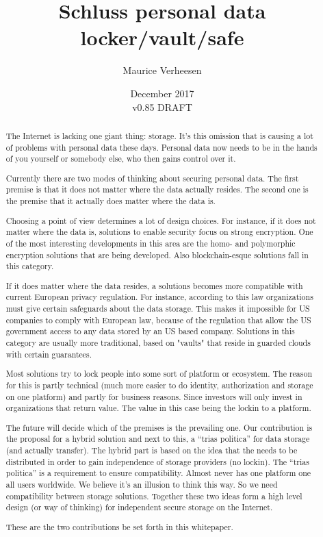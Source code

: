 \documentclass{article}
\title{Schluss personal data locker/vault/safe}
\author{Maurice Verheesen}
\date{December 2017 \\ v0.85 DRAFT}
\begin{document}
\maketitle
\begin{abstract}
The Internet is lacking one giant thing: storage. It's this omission that is causing
a lot of problems with personal data these days. Personal data now needs to be in the hands of you yourself or somebody else, who then gains control over it.

Currently there are two modes of thinking about securing personal data. The first
premise is that it does not matter where the data actually resides. The second one
is the premise that it actually does matter where the data is.

Choosing a point of view determines a lot of design choices. For instance, if it
does not matter where the data is, solutions to enable security focus on strong
encryption. One of the most interesting developments in this area are the homo- and
polymorphic encryption solutions that are being developed. Also blockchain-esque solutions fall in this category.

If it does matter where the data resides, a solutions becomes more compatible with
current European privacy regulation. For instance, according to this law organizations must give certain safeguards about the data storage. This makes it impossible for US companies to comply with European law, because of the regulation that allow the US government access to any data stored by an US based company. Solutions in this category are usually more traditional, based on "vaults" that reside in guarded clouds with
certain guarantees.

Most solutions try to lock people into some sort of platform or ecosystem. The reason for this is partly technical (much more easier to do identity, authorization and storage on one platform) and partly for business reasons. Since investors will only invest in organizations that return value. The value in this case being the lockin to a platform.

The future will decide which of the premises is the prevailing one. Our contribution
is the proposal for a hybrid solution and next to this, a ``trias politica'' for data
storage (and actually transfer). The hybrid part is based on the idea that the needs
to be distributed in order to gain independence of storage providers (no lockin). The ``trias politica'' is a requirement to ensure compatibility. Almost never has one platform one all users worldwide. We believe it's an illusion to think this way. So we need compatibility between storage solutions. Together these two ideas form a high level design (or way of thinking) for independent secure storage on the Internet.

These are the two contributions be set forth in this whitepaper.
\end{abstract}
\end{document}
